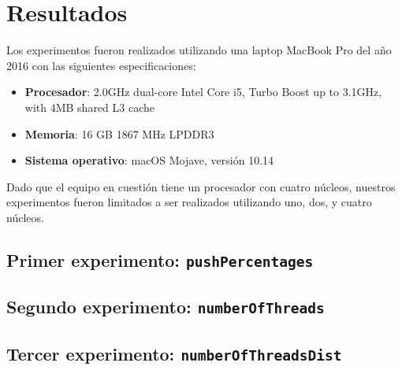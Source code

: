 \section{Resultados}

Los experimentos fueron realizados utilizando una laptop MacBook Pro del año 2016 con las siguientes especificaciones:

\begin{itemize}
    \item \textbf{Procesador}: 2.0GHz dual-core Intel Core i5, Turbo Boost up to 3.1GHz, with 4MB shared L3 cache
    \item \textbf{Memoria}: 16 GB 1867 MHz LPDDR3
    \item \textbf{Sistema operativo}: macOS Mojave, versión 10.14
\end{itemize}

Dado que el equipo en cuestión tiene un procesador con cuatro núcleos, nuestros experimentos fueron limitados a ser realizados utilizando uno, dos, y cuatro núcleos.

\subsection{Primer experimento: \texttt{pushPercentages}}
\subsection{Segundo experimento: \texttt{numberOfThreads}}
\subsection{Tercer experimento: \texttt{numberOfThreadsDist}}




